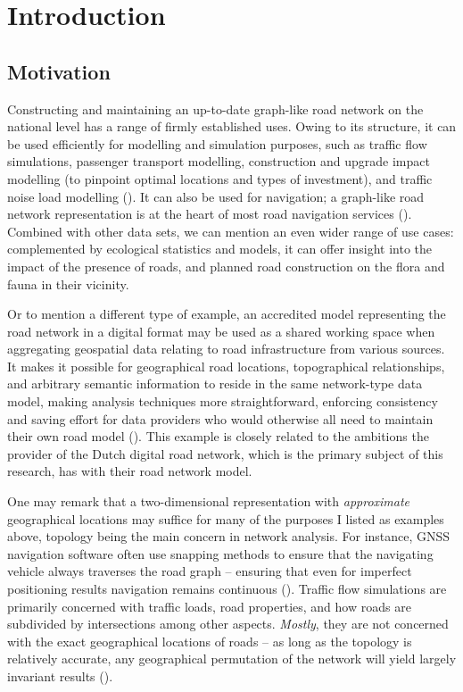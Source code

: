 
\chapter{Introduction}
\label{chap:i}

\section{Motivation}
\label{sec:motivation}

Constructing and maintaining an up-to-date graph-like road network on the national level has a range of firmly established uses. Owing to its structure, it can be used efficiently for modelling and simulation purposes, such as traffic flow simulations, passenger transport modelling, construction and upgrade impact modelling (to pinpoint optimal locations and types of investment), and traffic noise load modelling (\cite{bell_lida_1997, zhu_li_2007, zhang_2011, duran_santos_2014, peng_etal_2020}). It can also be used for navigation; a graph-like road network representation is at the heart of most road navigation services (\cite{yue_etal_2008}). Combined with other data sets, we can mention an even wider range of use cases: complemented by ecological statistics and models, it can offer insight into the impact of the presence of roads, and planned road construction on the flora and fauna in their vicinity.

Or to mention a different type of example, an accredited model representing the road network in a digital format may be used as a shared working space when aggregating geospatial data relating to road infrastructure from various sources. It makes it possible for geographical road locations, topographical relationships, and arbitrary semantic information to reside in the same network-type data model, making analysis techniques more straightforward, enforcing consistency and saving effort for data providers who would otherwise all need to maintain their own road model (\cite{ekpenyong_etal_2007}). This example is closely related to the ambitions the provider of the Dutch digital road network, which is the primary subject of this research, has with their road network model.

One may remark that a two-dimensional representation with \textit{approximate} geographical locations may suffice for many of the purposes I listed as examples above, topology being the main concern in network analysis. For instance, GNSS navigation software often use snapping methods to ensure that the navigating vehicle always traverses the road graph – ensuring that even for imperfect positioning results navigation remains continuous (\cite{fouque_bonnifait_2008, chen_hsu_2020}). Traffic flow simulations are primarily concerned with traffic loads, road properties, and how roads are subdivided by intersections among other aspects. \textit{Mostly}, they are not concerned with the exact geographical locations of roads – as long as the topology is relatively accurate, any geographical permutation of the network will yield largely invariant results (\cite{thomson_richardson_1995}).

